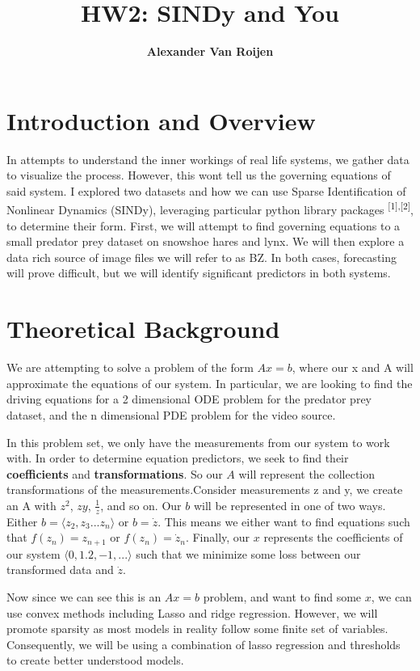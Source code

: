 \documentclass[12pt]{article}
\begin{document}
	
	\title{%
		HW2: SINDy and You}
	\author{\bf Alexander Van Roijen}
	
	\maketitle
	\section{Introduction and Overview}
	 In attempts to understand the inner workings of real life systems, we gather data to visualize the process. However, this wont tell us the governing equations of said system. I explored two datasets and how we can use Sparse Identification of Nonlinear Dynamics (SINDy), leveraging particular python library packages \textsuperscript{[1],[2]}, to determine their form. First, we will attempt to find governing equations to a small predator prey dataset on snowshoe hares and lynx. We will then explore a data rich source of image files we will refer to as BZ. In both cases, forecasting will prove difficult, but we will identify significant predictors in both systems. 
	
	\section{Theoretical Background}
	We are attempting to solve a problem of the form $Ax=b$, where our x and A will approximate the equations of our system. In particular, we are looking to find the driving equations for a 2 dimensional ODE problem for the predator prey dataset, and the n dimensional PDE problem for the video source.
	\par
	In this problem set, we only have the measurements from our system to work with. In order to determine equation predictors, we seek to find their \textbf{coefficients} and \textbf{transformations}. So our $A$ will represent the collection transformations of the measurements.Consider measurements z and y, we create an A with $z^2$, $zy$, $\frac{1}{z}$, and so on. Our $b$ will be represented in one of two ways. Either $b = \langle z_{2}, z_{3}...z_{n} \rangle$ or $b=\dot{z}$. This means we either want to find equations such that $f(z_n) = z_{n+1}$ or $f(z_n) = \dot z_n$.  Finally, our $x$ represents the coefficients of our system $\langle 0,1.2,-1,...\rangle$ such that we minimize some loss between our transformed data and $\dot z$. 
	\par
	Now since we can see this is an $Ax=b$ problem, and want to find some $x$, we can use convex methods including Lasso and ridge regression. However, we will promote sparsity as most models in reality follow some finite set of variables. Consequently, we will be using a combination of lasso regression and thresholds to create better understood models.
\end{document}
